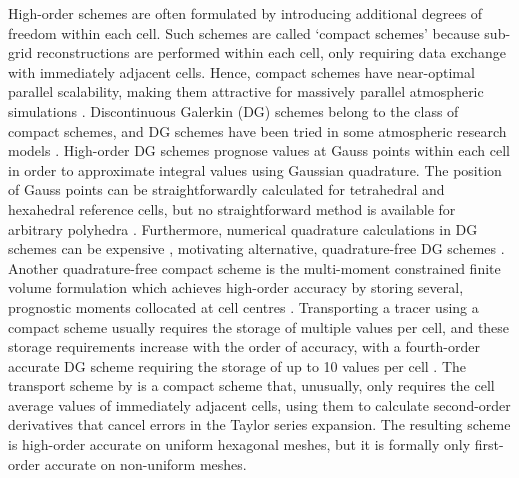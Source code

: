 High-order schemes are often formulated by introducing additional degrees of freedom within each cell.
Such schemes are called `compact schemes' because sub-grid reconstructions are performed within each cell, only requiring data exchange with immediately adjacent cells.
Hence, compact schemes have near-optimal parallel scalability, making them attractive for massively parallel atmospheric simulations \citep{ullrich2014}.
Discontinuous Galerkin (DG) schemes belong to the class of compact schemes, and DG schemes have been tried in some atmospheric research models \citep{nair2005,giraldo-restelli2008}.
High-order DG schemes prognose values at Gauss points within each cell in order to approximate integral values using Gaussian quadrature.
The position of Gauss points can be straightforwardly calculated for tetrahedral and hexahedral reference cells, but no straightforward method is available for arbitrary polyhedra \citep{costa2017}.
Furthermore, numerical quadrature calculations in DG schemes can be expensive \citep{dumbser2007}, motivating alternative, quadrature-free DG schemes \citep{atkins-shu1998,nair2015}.
Another quadrature-free compact scheme is the multi-moment constrained finite volume formulation which achieves high-order accuracy by storing several, prognostic moments collocated at cell centres \citep{ii-xiao2009}.
Transporting a tracer using a compact scheme usually requires the storage of multiple values per cell, and these storage requirements increase with the order of accuracy, with a fourth-order accurate DG scheme requiring the storage of up to 10 values per cell \citep{ullrich2010}.
The transport scheme by \citet{skamarock-gassmann2011} is a compact scheme that, unusually, only requires the cell average values of immediately adjacent cells, using them to calculate second-order derivatives that cancel errors in the Taylor series expansion.
The resulting scheme is high-order accurate on uniform hexagonal meshes, but it is formally only first-order accurate on non-uniform meshes.

